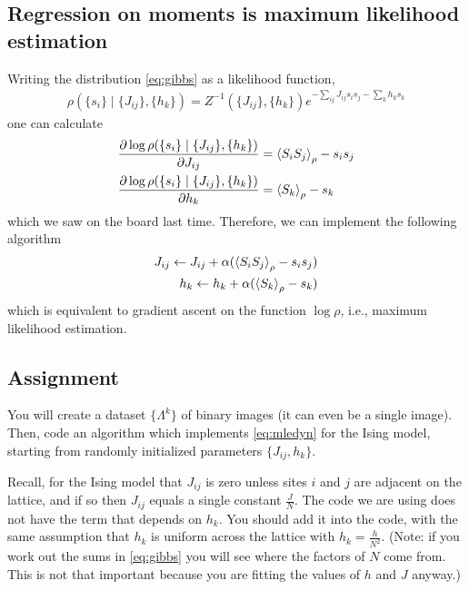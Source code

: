 \documentclass[11pt]{article}
\begin{document}
\subsection{Regression on moments is maximum likelihood estimation}
\label{sec:orgc454b43}
Writing the distribution \eqref{eq:gibbs} as a likelihood function,
\begin{align*}
\rho(\{s_{i}\} \mid \{J_{ij}\}, \{h_{k}\}) = Z^{-1}(\{J_{ij}\}, \{h_{k}\})
e^{-\sum_{ij} J_{ij}s_{i}s_{j} -\sum_{k} h_{k}s_{k}}
\end{align*}
one can calculate
\begin{align*}
\pdv{\log \rho(\{s_{i}\} \mid \{J_{ij}\}, \{h_{k}\})}{J_{ij}} &= \ev{S_{i}S_{j}}_{\rho} - s_{i}s_{j} \\
\pdv{\log \rho(\{s_{i}\} \mid \{J_{ij}\}, \{h_{k}\})}{h_{k}} &= \ev{S_{k}}_{\rho} - s_{k}
\end{align*}
which we saw on the board last time. Therefore, we can implement the following algorithm
\begin{align}
\label{eq:mledyn}
\begin{split}
J_{ij} \leftarrow J_{ij} + \alpha(\ev{S_{i}S_{j}}_{\rho} - s_{i}s_{j}) \\
h_{k} \leftarrow h_{k} + \alpha(\ev{S_{k}}_{\rho} - s_{k})
\end{split}
\end{align}
which is equivalent to gradient ascent on the function \(\log \rho\), i.e.,
maximum likelihood estimation.
\subsection{Assignment}
\label{sec:org6072e23}
You will create a dataset \(\{\Lambda^{k}\}\) of binary images (it can even be a
single image). Then, code an algorithm which implements \eqref{eq:mledyn} for
the Ising model, starting from randomly initialized parameters \(\{J_{ij},
h_{k}\}\).

Recall, for the Ising model that \(J_{ij}\) is zero unless
sites \(i\) and \(j\) are adjacent on the lattice, and if so then \(J_{ij}\)
equals a single constant \(\frac{J}{N}\). The code we are using does not have the term
that depends on \(h_{k}\). You should add it into the code, with the same
assumption that \(h_{k}\) is uniform across the lattice with
\(h_{k} = \frac{h}{N^{2}}\). (Note: if you work out the sums in
\eqref{eq:gibbs} you will see where the factors of \(N\) come from. This is not
that important because you are fitting the values of \(h\) and \(J\) anyway.)
\end{document}
